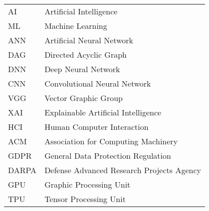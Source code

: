 %
%
%
%

\begin{acronyms}

\renewcommand{\arraystretch}{1.5}
\setlength{\tabcolsep}{3mm}
{\begin {tabular}{ll}

AI  &    Artificial Intelligence    \\
ML  &   Machine Learning    \\
ANN &   Artificial Neural Network   \\
DAG &   Directed Acyclic Graph  \\
DNN &   Deep Neural Network \\
CNN &   Convolutional Neural Network    \\
VGG   &   Vector Graphic Group \\
XAI &   Explainable Artificial Intelligence \\
HCI &   Human Computer Interaction  \\
ACM &   Association for Computing Machinery \\
GDPR    &   General Data Protection Regulation  \\
DARPA   &   Defense Advanced Research Projects Agency   \\
GPU &   Graphic Processing Unit \\
TPU &   Tensor Processing Unit  \\

\end {tabular}}

\end{acronyms}
